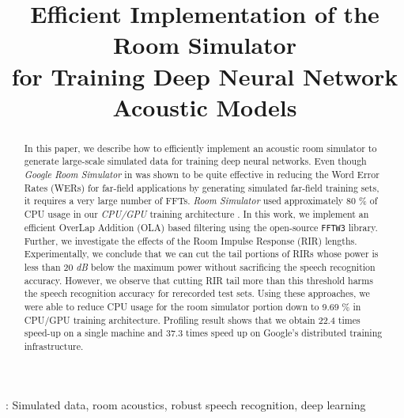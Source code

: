 \documentclass[a4paper]{article}
\title{Efficient Implementation of the Room Simulator \\ for Training Deep Neural Network Acoustic Models}
\begin{document}
%
\maketitle
%
\begin{abstract}




In this paper, we describe how to efficiently implement
an acoustic room simulator to generate large-scale
simulated data for training deep neural networks.
Even though \textit{Google Room Simulator} in \cite{C_Kim_INTERSPEECH_2017_1} was shown
 to be quite effective in reducing the Word
Error Rates (WERs) for far-field applications by generating
simulated far-field training sets, it requires a very large 
number of FFTs.
\textit{Room Simulator} used approximately 80 \% of CPU usage
  in our \textit{CPU/GPU} training architecture
  \cite{E_Variani_INTERSPEECH_2017_01}.
  In this work, we implement an efficient OverLap
  Addition (OLA) based filtering using the open-source \texttt{FFTW3}
library. Further, we investigate the effects of the Room
Impulse Response (RIR) lengths. Experimentally, we conclude that we can cut
the tail portions of RIRs whose power is less than 20 \textit{dB}
below the maximum power without sacrificing the speech recognition accuracy.
However, we observe that cutting  RIR tail more than this threshold
harms the speech recognition accuracy for rerecorded test sets.
Using these approaches, we were able to reduce CPU usage for the
room simulator portion down to 9.69 \%
in CPU/GPU training architecture. Profiling result shows that
we obtain 22.4 times speed-up on a single machine and 37.3 times
  speed up on Google's distributed training infrastructure.
 \end{abstract}
%
  : Simulated data, room acoustics, robust speech recognition, deep learning
%
%
\end{document}
